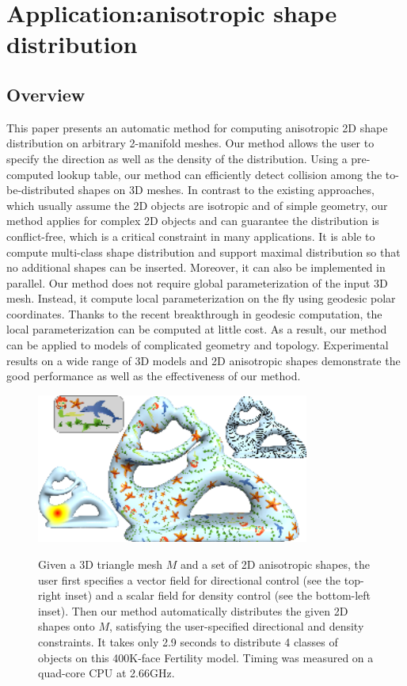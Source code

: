 \chapter{Application:anisotropic shape distribution}

\section{Overview}\label{sec:svg-overview}
  This paper presents an automatic method for computing anisotropic 2D shape distribution on arbitrary 2-manifold meshes.
  Our method allows the user to specify the direction as well as the density of the distribution.
  Using a pre-computed lookup table, our method can efficiently detect collision among the to-be-distributed shapes on 3D meshes.
  In contrast to the existing approaches, which usually assume the 2D objects are isotropic and of simple geometry,
  our method applies for complex 2D objects and can guarantee the distribution is conflict-free, which is a critical constraint in many applications.
  It is able to compute multi-class shape distribution and support maximal distribution so that no additional shapes can be inserted.
  Moreover, it can also be implemented in parallel.
  Our method does not require global parameterization of the input 3D mesh.
  Instead, it compute local parameterization on the fly using geodesic polar coordinates.
  Thanks to the recent breakthrough in geodesic computation, the local parameterization can be computed at little cost.
  As a result, our method can be applied to models of complicated geometry and topology.
  Experimental results on a wide range of 3D models and 2D anisotropic shapes demonstrate the good performance as well as the effectiveness of our method.

\begin{figure}[htbp]
  \centering
  \includegraphics[width=0.8\textwidth]{figs/asd/fertility_multiclass_density.png}\\
  \caption{Given a 3D triangle mesh $M$ and a set of 2D anisotropic shapes,
  the user first specifies a vector field for directional control (see the top-right inset) and a scalar field for density control (see the bottom-left inset).
  Then our method automatically distributes the given 2D shapes onto $M$, satisfying the user-specified directional and density constraints.
  It takes only 2.9 seconds to distribute 4 classes of objects on this 400K-face Fertility model.
  Timing was measured on a quad-core CPU at 2.66GHz.
  }
  \label{fig:teaser}
\end{figure}

